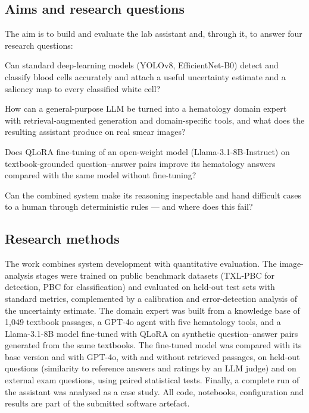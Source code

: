 \subsection{Aims and research questions}

The aim is to build and evaluate the lab assistant and, through it, to answer four research questions:

\begin{description}[leftmargin=1.2cm,style=nextline]
  \item[RQ1] Can standard deep-learning models (YOLOv8, EfficientNet-B0) detect and classify blood cells accurately and attach a useful uncertainty estimate and a saliency map to every classified white cell?
  \item[RQ2] How can a general-purpose LLM be turned into a hematology domain expert with retrieval-augmented generation and domain-specific tools, and what does the resulting assistant produce on real smear images?
  \item[RQ3] Does QLoRA fine-tuning of an open-weight model (Llama-3.1-8B-Instruct) on textbook-grounded question--answer pairs improve its hematology answers compared with the same model without fine-tuning?
  \item[RQ4] Can the combined system make its reasoning inspectable and hand difficult cases to a human through deterministic rules --- and where does this fail?
\end{description}

\subsection{Research methods}

The work combines system development with quantitative evaluation. The image-analysis stages were trained on public benchmark datasets (TXL-PBC for detection, PBC for classification) and evaluated on held-out test sets with standard metrics, complemented by a calibration and error-detection analysis of the uncertainty estimate. The domain expert was built from a knowledge base of 1{,}049 textbook passages, a GPT-4o agent with five hematology tools, and a Llama-3.1-8B model fine-tuned with QLoRA on synthetic question--answer pairs generated from the same textbooks. The fine-tuned model was compared with its base version and with GPT-4o, with and without retrieved passages, on held-out questions (similarity to reference answers and ratings by an LLM judge) and on external exam questions, using paired statistical tests. Finally, a complete run of the assistant was analysed as a case study. All code, notebooks, configuration and results are part of the submitted software artefact.

